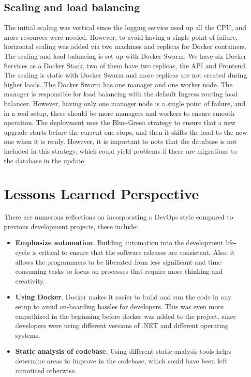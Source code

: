 \documentclass[10pt]{article}
\begin{document}
\subsection{Scaling and load balancing}
The initial scaling was vertical since the logging service used up all the CPU, and more resources were needed. However, to avoid having a single point of failure, horizontal scaling was added via two machines and replicas for Docker containers.
The scaling and load balancing is set up with Docker Swarm. We have six Docker Services as a Docker Stack, two of them have two replicas, the API and Frontend. The scaling is static with Docker Swarm and more replicas are not created during higher loads. The Docker Swarm has one manager and one worker node. The manager is responsible for load balancing with the default Ingress routing load balancer. However, having only one manager node is a single point of failure, and in a real setup, there should be more managers and workers to ensure smooth operation. The deployment uses the Blue-Green strategy to ensure that a new upgrade starts before the current one stops, and then it shifts the load to the new one when it is ready. However, it is important to note that the database is not included in this strategy, which could yield problems if there are migrations to the database in the update.

\section{Lessons Learned Perspective}
There are numerous reflections on incorporating a DevOps style compared to previous development projects, these include:
\begin{itemize}
\item \textbf{Emphasize automation}. Building automation into the development life-cycle is critical to ensure that the software releases are consistent. Also, it allows the programmers to be liberated from less significant and time-consuming tasks to focus on processes that require more thinking and creativity.
\item \textbf{Using Docker}. Docker makes it easier to build and run the code in any setup to avoid on-boarding hassles for developers. This was even more empathized in the beginning before docker was added to the project, since developers were using different versions of .NET and different operating systems.
\item \textbf{Static analysis of codebase}. Using different static analysis tools helps determine areas to improve in the codebase, which could have been left unnoticed otherwise.
\end{itemize}
\end{document}
